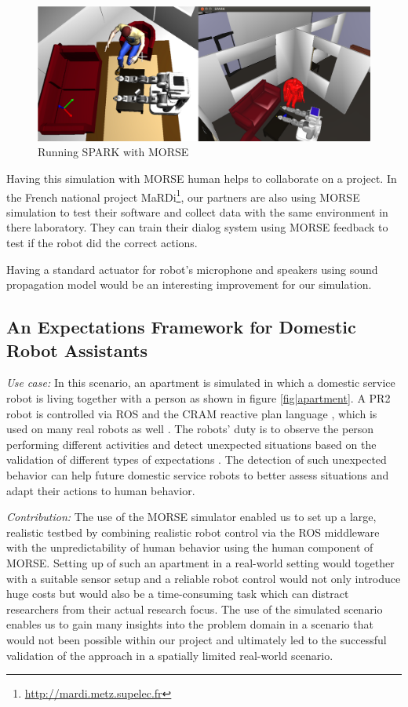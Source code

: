 \documentclass[conference]{IEEEtran}
\begin{document}
\begin{figure}[H]
      \centering
      \includegraphics[width=0.9\linewidth]{morsespark.png}
      \caption{Running SPARK with MORSE}
      \label{fig|spark}
\end{figure}

Having this simulation with MORSE human helps to collaborate on a project.
In the French national project MaRDi\footnote{\url{http://mardi.metz.supelec.fr}},
our partners are also using MORSE simulation to test their software and collect 
data with the same environment in there laboratory.
They can train their dialog system using MORSE feedback to test if the robot
did the correct actions.

Having a standard actuator for robot's microphone and speakers using sound
propagation model would be an interesting improvement for our simulation.

\subsection{An Expectations Framework for Domestic Robot Assistants}
\label{sc:expectations}

\emph{Use case:} In this scenario, an apartment is simulated in which a domestic 
service robot is living together with a person as shown in figure \ref{fig|apartment}. 
A PR2 robot is controlled via ROS and the CRAM reactive plan language \cite{beetz2010cram}, 
which is used on many real robots as well \cite{pancakes11humanoids}. The robots' 
duty is to observe the person performing different activities and detect unexpected 
situations based on the validation of different types of expectations \cite{Karg2013}. 
The detection of such unexpected behavior can help future domestic service robots 
to better assess situations and adapt their actions to human behavior. 

\emph{Contribution:} The use of the MORSE simulator enabled us to set up a large, 
realistic testbed by combining realistic robot control via the ROS middleware with the
unpredictability of human behavior using the human component of MORSE. Setting
up of such an apartment in a real-world setting would together with a suitable
sensor setup and a reliable robot control would not only introduce huge costs
but would also be a time-consuming task which can distract researchers from
their actual research focus. The use of the simulated scenario enables us to
gain many insights into the problem domain in a scenario that would not been
possible within our project and ultimately led to the successful validation of
the approach in a spatially limited real-world scenario.
\end{document}
